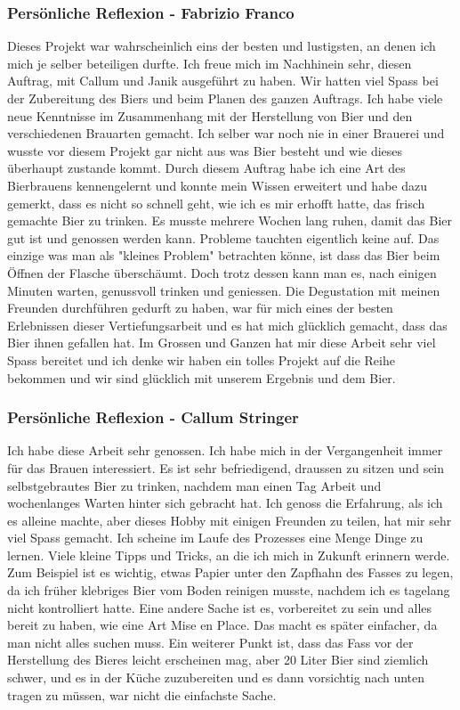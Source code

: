 \subsubsection{Persönliche Reflexion - Fabrizio Franco}
Dieses Projekt war wahrscheinlich eins der besten und lustigsten, an denen ich mich je selber beteiligen durfte. Ich freue mich im Nachhinein sehr, diesen Auftrag, mit Callum und Janik ausgeführt zu haben. Wir hatten viel Spass bei der Zubereitung des Biers und beim Planen des ganzen Auftrags. Ich habe viele neue Kenntnisse im Zusammenhang mit der Herstellung von Bier und den verschiedenen Brauarten gemacht. Ich selber war noch nie in einer Brauerei und wusste vor diesem Projekt gar nicht aus was Bier besteht und wie dieses überhaupt zustande kommt. Durch diesem Auftrag habe ich eine Art des Bierbrauens kennengelernt und konnte mein Wissen erweitert und habe dazu gemerkt, dass es nicht so schnell geht, wie ich es mir erhofft hatte, das frisch gemachte Bier zu trinken. Es musste mehrere Wochen lang ruhen, damit das Bier gut ist und genossen werden kann. Probleme tauchten eigentlich keine auf. Das einzige was man als "kleines Problem" betrachten könne, ist dass das Bier beim Öffnen der Flasche überschäumt. Doch trotz dessen kann man es, nach einigen Minuten warten, genussvoll trinken und geniessen. Die Degustation mit meinen Freunden durchführen gedurft zu haben, war für mich eines der besten Erlebnissen dieser Vertiefungsarbeit und es hat mich glücklich gemacht, dass das Bier ihnen gefallen hat. Im Grossen und Ganzen hat mir diese Arbeit sehr viel Spass bereitet und ich denke
 wir haben ein tolles Projekt auf die Reihe bekommen und wir sind glücklich mit unserem Ergebnis und dem Bier.
 \newpage
\subsubsection{Persönliche Reflexion - Callum Stringer}
Ich habe diese Arbeit sehr genossen. Ich habe mich in der Vergangenheit immer für das Brauen interessiert. Es ist sehr befriedigend, draussen zu sitzen und sein selbstgebrautes Bier zu trinken, nachdem man einen Tag Arbeit und wochenlanges Warten hinter sich gebracht hat.
Ich genoss die Erfahrung, als ich es alleine machte, aber dieses Hobby mit einigen Freunden zu teilen, hat mir sehr viel Spass gemacht.
Ich scheine im Laufe des Prozesses eine Menge Dinge zu lernen. Viele kleine Tipps und Tricks, an die ich mich in Zukunft erinnern werde.
Zum Beispiel ist es wichtig, etwas Papier unter den Zapfhahn des Fasses zu legen, da ich früher klebriges Bier vom Boden reinigen musste,
nachdem ich es tagelang nicht kontrolliert hatte.
Eine andere Sache ist es, vorbereitet zu sein und alles bereit zu haben, wie eine Art Mise en Place. Das macht es später einfacher, da man
nicht alles suchen muss.
Ein weiterer Punkt ist, dass das Fass vor der Herstellung des Bieres leicht erscheinen mag, aber 20 Liter Bier sind ziemlich schwer,
und es in der Küche zuzubereiten und es dann vorsichtig nach unten tragen zu müssen, war nicht die einfachste Sache.

